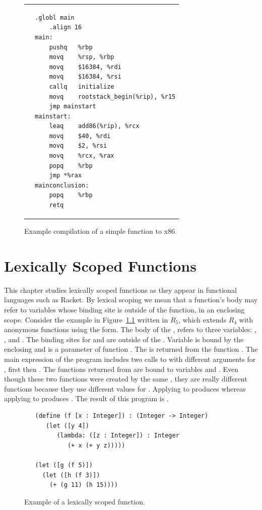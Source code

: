 \documentclass[11pt]{book}
\begin{document}
\begin{figure}[htbp]
\begin{tabular}{ll}
\begin{minipage}{0.3\textwidth}
\end{minipage}
&
\begin{minipage}{0.5\textwidth}
\begin{lstlisting}[basicstyle=\ttfamily\scriptsize]
	.globl main
	.align 16
main:
	pushq	%rbp
	movq	%rsp, %rbp
	movq	$16384, %rdi
	movq	$16384, %rsi
	callq	initialize
	movq	rootstack_begin(%rip), %r15
	jmp	mainstart
mainstart:
	leaq	add86(%rip), %rcx
	movq	$40, %rdi
	movq	$2, %rsi
	movq	%rcx, %rax
	popq	%rbp
	jmp	*%rax
mainconclusion:
	popq	%rbp
	retq
\end{lstlisting}
\end{minipage}
\end{tabular}
\caption{Example compilation of a simple function to x86.}
\label{fig:add-fun}
\end{figure}




\chapter{Lexically Scoped Functions}
\label{ch:lambdas}

This chapter studies lexically scoped functions as they appear in
functional languages such as Racket. By lexical scoping we mean that a
function's body may refer to variables whose binding site is outside
of the function, in an enclosing scope.
%
Consider the example in Figure~\ref{fig:lexical-scoping} written in
$R_5$, which extends $R_4$ with anonymous functions using the
 form.  The body of the , refers to three
variables: , , and . The binding sites for
 and  are outside of the . Variable
 is bound by the enclosing  and  is a
parameter of function . The  is returned from the
function . The main expression of the program includes two
calls to  with different arguments for , first
 then . The functions returned from  are bound
to variables  and . Even though these two functions
were created by the same , they are really different
functions because they use different values for . Applying
 to  produces  whereas applying  to
 produces . The result of this program is .

\begin{figure}[btp]
\begin{lstlisting}
   (define (f [x : Integer]) : (Integer -> Integer)
      (let ([y 4])
         (lambda: ([z : Integer]) : Integer
            (+ x (+ y z)))))

   (let ([g (f 5)])
     (let ([h (f 3)])
       (+ (g 11) (h 15))))
\end{lstlisting}
\caption{Example of a lexically scoped function.}
\label{fig:lexical-scoping}
\end{figure}
\end{document}
